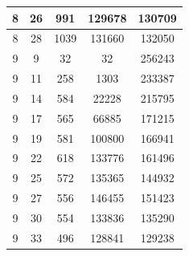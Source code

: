 \documentclass[a4paper,14pt]{extarticle}
\begin{document}
\begin{enumerate}[1.]
\begin{tabular}{|c|c|c|c|c|}
              \hline
              8                                  & 26                                & 991                                     & 129678        & 130709 \\
              \hline
              8                                  & 28                                & 1039                                    & 131660        & 132050 \\
              \hline
              9                                  & 9                                 & 32                                      & 32            & 256243 \\
              \hline
              9                                  & 11                                & 258                                     & 1303          & 233387 \\
              \hline
              9                                  & 14                                & 584                                     & 22228         & 215795 \\
              \hline
              9                                  & 17                                & 565                                     & 66885         & 171215 \\
              \hline
              9                                  & 19                                & 581                                     & 100800        & 166941 \\
              \hline
              9                                  & 22                                & 618                                     & 133776        & 161496 \\
              \hline
              9                                  & 25                                & 572                                     & 135365        & 144932 \\
              \hline
              9                                  & 27                                & 556                                     & 146455        & 151423 \\
              \hline
              9                                  & 30                                & 554                                     & 133836        & 135290 \\
              \hline
              9                                  & 33                                & 496                                     & 128841        & 129238 \\
              \hline

\end{tabular}
\end{enumerate}
\end{document}
